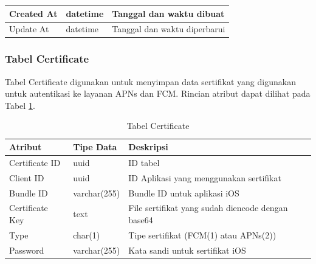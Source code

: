 \begin{longtable}{|p{2cm}|p{2.5cm}|p{4.5cm}|}
    Created At & datetime & Tanggal dan waktu dibuat \\ \hline
    Update At & datetime & Tanggal dan waktu diperbarui \\ \hline
\end{longtable}

\subsubsection{Tabel Certificate}
\par Tabel Certificate digunakan untuk menyimpan data sertifikat yang digunakan untuk autentikasi ke layanan APNs dan FCM. Rincian atribut dapat dilihat pada Tabel \ref{tabel_certificate}.
\begin{longtable}{|p{2cm}|p{2.5cm}|p{4.5cm}|}
	\caption{Tabel Certificate} \label{tabel_certificate} \\ \hline
    \rowcolor{lightgray} {Atribut} & {Tipe Data} & {Deskripsi} \\ \hline
    \endhead
    Certificate ID & uuid & ID tabel \\ \hline
    Client ID & uuid & ID Aplikasi yang menggunakan sertifikat \\ \hline
    Bundle ID & varchar(255) & Bundle ID untuk aplikasi iOS \\ \hline
    Certificate Key & text & File sertifikat yang sudah diencode dengan base64 \\ \hline
    Type & char(1) & Tipe sertifikat (FCM(1) atau APNs(2)) \\ \hline
    Password & varchar(255) & Kata sandi untuk sertifikat iOS \\ \hline
\end{longtable}

